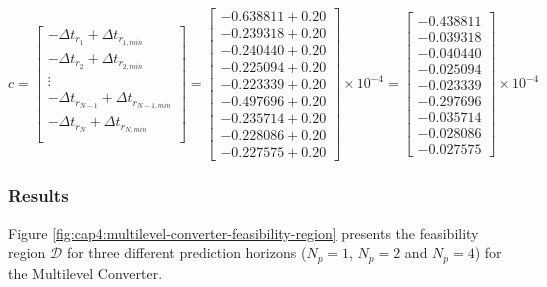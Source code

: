 \begin{equation}
    c = 
    \left[
        \begin{matrix}
            -\Delta t_{r_1} +\Delta t_{r_{1, min}} \\
            -\Delta t_{r_2} +\Delta t_{r_{2, min}} \\
            \vdots \\
            -\Delta t_{r_{N-1}} +\Delta t_{r_{{N-1}, min}} \\
            -\Delta t_{r_N} +\Delta t_{r_{N, min}} \\
        \end{matrix}
    \right] = 
    \left[
        \begin{matrix}
            -0.638811 + 0.20 \\
            -0.239318 + 0.20 \\
            -0.240440 + 0.20 \\
            -0.225094 + 0.20 \\
            -0.223339 + 0.20 \\
            -0.497696 + 0.20 \\
            -0.235714 + 0.20 \\
            -0.228086 + 0.20 \\
            -0.227575 + 0.20
        \end{matrix}
    \right] \times 10^{ -4  }=
    \left[
        \begin{matrix}
            -0.438811 \\
            -0.039318 \\
            -0.040440 \\
            -0.025094 \\
            -0.023339 \\
            -0.297696 \\
            -0.035714 \\
            -0.028086 \\
            -0.027575
        \end{matrix}
    \right] \times 10^{ -4 }
\end{equation}

\subsubsection{Results}


Figure \ref{fig:cap4:multilevel-converter-feasibility-region} presents the feasibility region $\mathcal{D}$ for three different prediction horizons 
($N_p = 1$, $N_p = 2$ and $N_p = 4$) for the Multilevel Converter.


